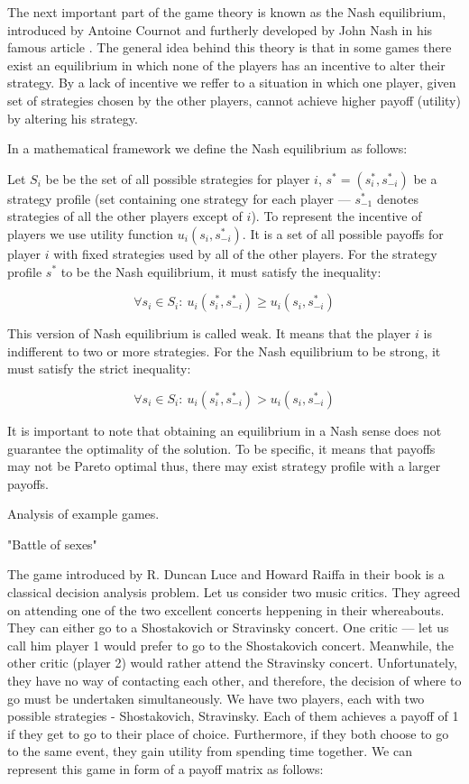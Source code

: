 \documentclass[english, twoside, 12pt, a4paper]{article}
\theoremstyle{definition}
\theoremstyle{plain}
\theoremstyle{remark}
\begin{document}
The next important part of the game theory is known as the Nash equilibrium, introduced by Antoine Cournot and furtherly developed by John Nash in his famous article \cite{nash1951non}. 
The general idea behind this theory is that in some games there exist an equilibrium in which none of the players has an incentive to alter their strategy.
By a lack of incentive we reffer to a situation in which one player, given set of strategies chosen by the other players, cannot achieve higher payoff (utility) by altering his strategy.

In a mathematical framework we define the Nash equilibrium as follows:

Let $S_i$ be be the set of all possible strategies for player $i$, $s^* = (s^*_i, s_{-i}^*)$ be a strategy profile (set containing one strategy for each player --- $s_{-1}^*$ denotes strategies of all the other players except of $i$).
To represent the incentive of players we use utility function $u_i(s_i,s_{-i}^*)$. It is a set of all possible payoffs for player $i$ with fixed strategies used by all of the other players.
For the strategy profile $s^*$ to be the Nash equilibrium, it must satisfy the inequality:

\[\forall s_i \in S_i:\:u_i(s_i^*, s_{-i}^*) \geq u_i(s_i, s_{-i}^*)\]

This version of Nash equilibrium is called weak. It means that the player $i$ is indifferent to two or more strategies. For the Nash equilibrium to be strong, it must satisfy the strict inequality:

\[\forall s_i \in S_i:\:u_i(s_i^*, s_{-i}^*) > u_i(s_i, s_{-i}^*)\]

It is important to note that obtaining an equilibrium in a Nash sense does not guarantee the optimality of the solution. To be specific, it means that payoffs may not be Pareto optimal \cite{wozny2012lecture} thus, there may exist strategy profile with a larger payoffs. 

Analysis of example games.

"Battle of sexes"

The game introduced by R. Duncan Luce and Howard Raiffa in their book \cite{luce1989games} is a classical decision analysis problem. Let us consider two music critics. They agreed on attending one of the two excellent concerts heppening in their whereabouts. They can either go to a Shostakovich or  Stravinsky concert. 
One critic --- let us call him player 1 would prefer to go to the Shostakovich concert. Meanwhile, the other critic (player 2) would rather attend the Stravinsky concert. Unfortunately, they have no way of contacting each other, and therefore, the decision of where to go must be undertaken simultaneously.
We have two players, each with two possible strategies - {Shostakovich, Stravinsky}. Each of them achieves a payoff of 1 if they get to go to their place of choice. Furthermore, if they both choose to go to the same event, they gain utility from spending time together. We can represent this game in form of a payoff matrix as follows:
\end{document}
